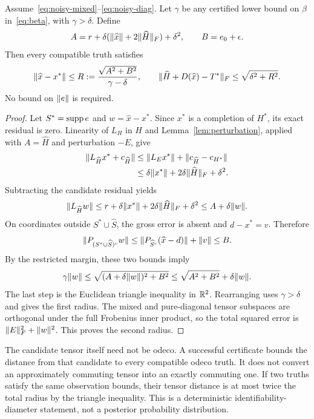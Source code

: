 \begin{theorem}\label{thm:posterior}
Assume~\eqref{eq:noisy-mixed}--\eqref{eq:noisy-diag}. Let $\gamma$ be any certified lower bound on $\beta$ in~\eqref{eq:beta}, with $\gamma>\delta$. Define
\begin{equation}\label{eq:ab}
 A=r+\delta(\lVert \widehat x\rVert+2\lVert \widehat H\rVert_F)+\delta^2,
 \qquad B=e_0+\epsilon.
\end{equation}
Then every compatible truth satisfies
\begin{equation}\label{eq:posterior}
 \lVert \widehat x-x^*\rVert\le
 R:=\frac{\sqrt{A^2+B^2}}{\gamma-\delta},
 \qquad
 \lVert \widehat H+D(\widehat x)-T^*\rVert_F
 \le\sqrt{\delta^2+R^2}.
\end{equation}
No bound on $\lVert e\rVert$ is required.
\end{theorem}
\begin{proof}
Let $S^*=\operatorname{supp} e$ and $w=\widehat x-x^*$. Since $x^*$ is a completion of $H^*$, its exact residual is zero. Linearity of $L_H$ in $H$ and Lemma~\ref{lem:perturbation}, applied with $A=\widehat H$ and perturbation $-E$, give
\begin{align*}
 \lVert L_{\widehat H}x^*+c_{\widehat H}\rVert
 &\le\lVert L_E x^*\rVert+\lVert c_{\widehat H}-c_{H^*}\rVert\\
 &\le\delta\lVert x^*\rVert+2\delta\lVert \widehat H\rVert_F+\delta^2.
\end{align*}
Subtracting the candidate residual yields
\[
 \lVert L_{\widehat H}w\rVert
 \le r+\delta\lVert x^*\rVert+2\delta\lVert \widehat H\rVert_F+\delta^2
 \le A+\delta\lVert w\rVert.
\]
On coordinates outside $S^*\cup\widehat S$, the gross error is absent and $d-x^*=v$. Therefore
\[
 \lVert P_{(S^*\cup\widehat S)^c}w\rVert
 \le\lVert P_{\widehat S^c}(\widehat x-d)\rVert+\lVert v\rVert
 \le B.
\]
By the restricted margin, these two bounds imply
\[
 \gamma\lVert w\rVert\le\sqrt{(A+\delta\lVert w\rVert)^2+B^2}
 \le\sqrt{A^2+B^2}+\delta\lVert w\rVert.
\]
The last step is the Euclidean triangle inequality in $\mathbb R^2$. Rearranging uses $\gamma>\delta$ and gives the first radius. The mixed and pure-diagonal tensor subspaces are orthogonal under the full Frobenius inner product, so the total squared error is $\lVert E\rVert_F^2+\lVert w\rVert^2$. This proves the second radius.
\end{proof}

The candidate tensor itself need not be odeco. A successful certificate bounds the distance from that candidate to every compatible odeco truth. It does not convert an approximately commuting tensor into an exactly commuting one. If two truths satisfy the same observation bounds, their tensor distance is at most twice the total radius by the triangle inequality. This is a deterministic identifiability-diameter statement, not a posterior probability distribution.

